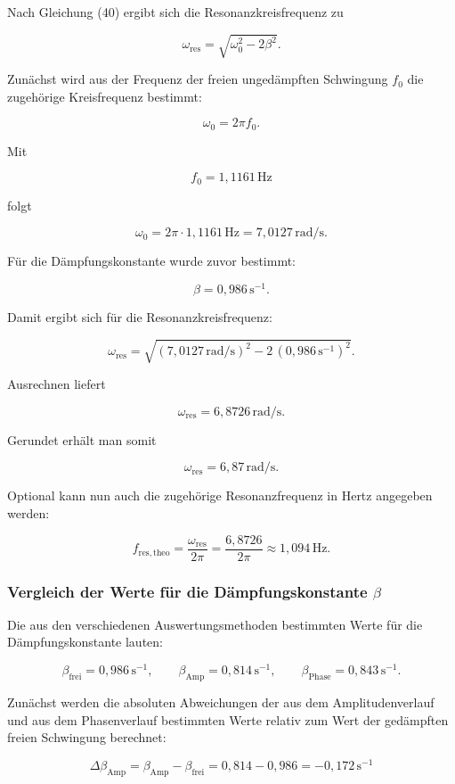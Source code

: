 \documentclass{report}
\begin{document}
Nach Gleichung (40) ergibt sich die Resonanzkreisfrequenz zu

\[
\omega_\mathrm{res}=\sqrt{\omega_0^2-2\beta^2}.
\]

Zunächst wird aus der Frequenz der freien ungedämpften 
Schwingung $f_0$ die zugehörige Kreisfrequenz bestimmt:

\[
\omega_0 = 2\pi f_0.
\]

Mit

\[
f_0 = 1{,}1161\,\mathrm{Hz}
\]

folgt

\[
\omega_0 = 2\pi \cdot 1{,}1161\,\mathrm{Hz}
= 7{,}0127\,\mathrm{rad/s}.
\]

Für die Dämpfungskonstante wurde zuvor bestimmt:

\[
\beta = 0{,}986\,\mathrm{s^{-1}}.
\]

Damit ergibt sich für die Resonanzkreisfrequenz:

\[
\omega_\mathrm{res}
=
\sqrt{(7{,}0127\,\mathrm{rad/s})^2-2\,(0{,}986\,\mathrm{s^{-1}})^2}.
\]

Ausrechnen liefert

\[
\omega_\mathrm{res}
=
6{,}8726\,\mathrm{rad/s}.
\]

Gerundet erhält man somit

\[
\boxed{\omega_\mathrm{res}=6{,}87\,\mathrm{rad/s}}.
\]

Optional kann nun auch die zugehörige Resonanzfrequenz in Hertz angegeben werden:

\[
f_\mathrm{res,theo}=\frac{\omega_\mathrm{res}}{2\pi}
=\frac{6{,}8726}{2\pi}
\approx 1{,}094\,\mathrm{Hz}.
\]

\subsubsection*{Vergleich der Werte für die Dämpfungskonstante $\beta$}

Die aus den verschiedenen Auswertungsmethoden bestimmten Werte für die Dämpfungskonstante lauten:

\[
\beta_{\text{frei}} = 0{,}986\,\mathrm{s^{-1}},
\qquad
\beta_{\text{Amp}} = 0{,}814\,\mathrm{s^{-1}},
\qquad
\beta_{\text{Phase}} = 0{,}843\,\mathrm{s^{-1}}.
\]

Zunächst werden die absoluten Abweichungen der aus dem Amplitudenverlauf und aus dem Phasenverlauf bestimmten Werte relativ zum Wert der gedämpften freien Schwingung berechnet:

\[
\Delta \beta_{\text{Amp}}
=
\beta_{\text{Amp}}-\beta_{\text{frei}}
=
0{,}814-0{,}986
=
-0{,}172\,\mathrm{s^{-1}}
\]
\end{document}

